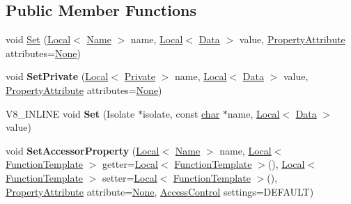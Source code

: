 \subsection*{Public Member Functions}
\begin{DoxyCompactItemize}
\item 
void \mbox{\hyperlink{classv8_1_1Template_a623b9f0cdd87dc861516f276cc9a7cfa}{Set}} (\mbox{\hyperlink{classv8_1_1Local}{Local}}$<$ \mbox{\hyperlink{classv8_1_1Name}{Name}} $>$ name, \mbox{\hyperlink{classv8_1_1Local}{Local}}$<$ \mbox{\hyperlink{classv8_1_1Data}{Data}} $>$ value, \mbox{\hyperlink{namespacev8_a05f25f935e108a1ea2d150e274602b87}{Property\+Attribute}} attributes=\mbox{\hyperlink{namespacev8_a05f25f935e108a1ea2d150e274602b87a7ab4d58719c33b3ea2dfaefa29b111df}{None}})
\item 
\mbox{\label{classv8_1_1Template_a91214bdb0cc2d6534c81742e67fc4cc4}} 
void {\bfseries Set\+Private} (\mbox{\hyperlink{classv8_1_1Local}{Local}}$<$ \mbox{\hyperlink{classv8_1_1Private}{Private}} $>$ name, \mbox{\hyperlink{classv8_1_1Local}{Local}}$<$ \mbox{\hyperlink{classv8_1_1Data}{Data}} $>$ value, \mbox{\hyperlink{namespacev8_a05f25f935e108a1ea2d150e274602b87}{Property\+Attribute}} attributes=\mbox{\hyperlink{namespacev8_a05f25f935e108a1ea2d150e274602b87a7ab4d58719c33b3ea2dfaefa29b111df}{None}})
\item 
\mbox{\label{classv8_1_1Template_adc2fc88ac8df0d12b44d4c16ff0128cc}} 
V8\+\_\+\+I\+N\+L\+I\+NE void {\bfseries Set} (Isolate $\ast$isolate, const \mbox{\hyperlink{classchar}{char}} $\ast$name, \mbox{\hyperlink{classv8_1_1Local}{Local}}$<$ \mbox{\hyperlink{classv8_1_1Data}{Data}} $>$ value)
\item 
\mbox{\label{classv8_1_1Template_a5c702a91581d6cf8cfb72c24ba8b8d17}} 
void {\bfseries Set\+Accessor\+Property} (\mbox{\hyperlink{classv8_1_1Local}{Local}}$<$ \mbox{\hyperlink{classv8_1_1Name}{Name}} $>$ name, \mbox{\hyperlink{classv8_1_1Local}{Local}}$<$ \mbox{\hyperlink{classv8_1_1FunctionTemplate}{Function\+Template}} $>$ getter=\mbox{\hyperlink{classv8_1_1Local}{Local}}$<$ \mbox{\hyperlink{classv8_1_1FunctionTemplate}{Function\+Template}} $>$(), \mbox{\hyperlink{classv8_1_1Local}{Local}}$<$ \mbox{\hyperlink{classv8_1_1FunctionTemplate}{Function\+Template}} $>$ setter=\mbox{\hyperlink{classv8_1_1Local}{Local}}$<$ \mbox{\hyperlink{classv8_1_1FunctionTemplate}{Function\+Template}} $>$(), \mbox{\hyperlink{namespacev8_a05f25f935e108a1ea2d150e274602b87}{Property\+Attribute}} attribute=\mbox{\hyperlink{namespacev8_a05f25f935e108a1ea2d150e274602b87a7ab4d58719c33b3ea2dfaefa29b111df}{None}}, \mbox{\hyperlink{namespacev8_a31d8355cb043d7d2dda3f4a52760b64e}{Access\+Control}} settings=D\+E\+F\+A\+U\+LT)

\end{DoxyCompactItemize}
